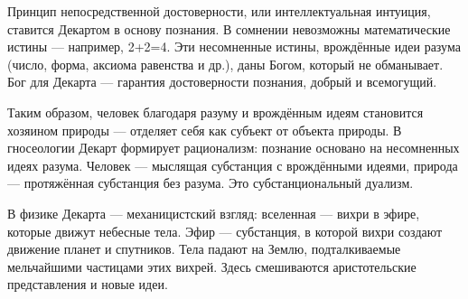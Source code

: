 Принцип непосредственной достоверности, или интеллектуальная интуиция, ставится Декартом в основу познания. В сомнении невозможны математические истины --- например, 2+2=4. Эти несомненные истины, врождённые идеи разума (число, форма, аксиома равенства и др.), даны Богом, который не обманывает. Бог для Декарта --- гарантия достоверности познания, добрый и всемогущий.

Таким образом, человек благодаря разуму и врождённым идеям становится хозяином природы --- отделяет себя как субъект от объекта природы. В гносеологии Декарт формирует рационализм: познание основано на несомненных идеях разума. Человек --- мыслящая субстанция с врождёнными идеями, природа --- протяжённая субстанция без разума. Это субстанциональный дуализм.

В физике Декарта --- механицистский взгляд: вселенная --- вихри в эфире, которые движут небесные тела. Эфир --- субстанция, в которой вихри создают движение планет и спутников. Тела падают на Землю, подталкиваемые мельчайшими частицами этих вихрей. Здесь смешиваются аристотельские представления и новые идеи.






